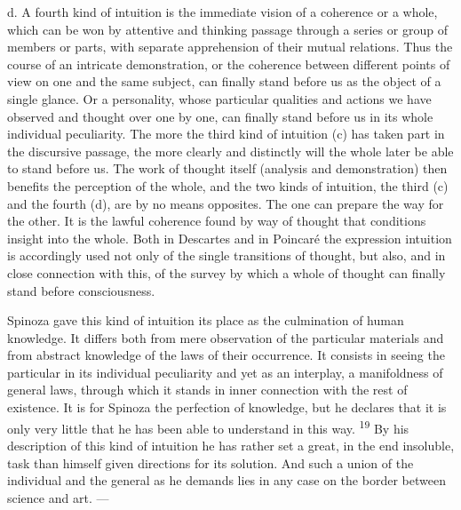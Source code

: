 \documentclass[12pt,a4paper,openany]{book}
\newcommand{\opage}[1]{\marginnote{\footnotesize\textit{[#1]}}}
\newcommand{\nm}[1]{\unskip\textsuperscript{#1}}
\begin{document}
d. A fourth kind of intuition is the immediate vision of a coherence or a whole, which can be won by attentive and thinking passage through a series or group of members or parts, with separate apprehension of their mutual relations. Thus the course of an intricate demonstration, or the coherence between different points of view on one and the same subject, can finally stand before us as the object of a single glance. Or a personality, whose particular qualities and actions we have observed and thought over one by one, can finally stand before us in its whole individual peculiarity. The more the third kind of intuition (c) has taken part in the discursive passage, the more clearly and distinctly will the whole later be able to stand before us. The work of thought itself (analysis and demonstration) then benefits the perception of the whole, and the two kinds of intuition, the third (c) and the fourth (d), are by no means opposites. The one can prepare the way for the other. It is the lawful coherence found by way of thought that
\opage{25}conditions insight into the whole. Both in Descartes and in Poincaré the expression intuition is accordingly used not only of the single transitions of thought, but also, and in close connection with this, of the survey by which a whole of thought can finally stand before consciousness.

Spinoza gave this kind of intuition its place as the culmination of human knowledge. It differs both from mere observation of the particular materials and from abstract knowledge of the laws of their occurrence. It consists in seeing the particular in its individual peculiarity and yet as an interplay, a manifoldness of general laws, through which it stands in inner connection with the rest of existence. It is for Spinoza the perfection of knowledge, but he declares that it is only very little that he has been able to understand in this way. \nm{19} By his description of this kind of intuition he has rather set a great, in the end insoluble, task than himself given directions for its solution. And such a union of the individual and the general as he demands lies in any case on the border between science and art. ---
\end{document}
